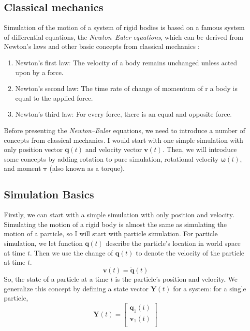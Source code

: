 \subsection{Classical mechanics}
Simulation of the motion of a system of rigid bodies is based on a famous system of differential equations, the \textit{Newton–Euler equations}, which can be derived from Newton’s laws and other basic concepts from classical mechanics \cite{bender2014interactive}:

\begin{enumerate}
    \item Newton’s first law: The velocity of a body remains unchanged unless acted upon by a force.
    \item Newton’s second law: The time rate of change of momentum of r a body is equal to the applied force.
    \item Newton’s third law: For every force, there is an equal and opposite force.
\end{enumerate}

Before presenting the \textit{Newton–Euler} equations, we need to introduce a number of concepts from classical mechanics. I would start with one simple simulation with only position vector $\pmb{q}(t)$ and velocity vector $\pmb{v}(t)$. Then, we will introduce some concepts by adding rotation to pure simulation, rotational velocity $\pmb{\omega}(t)$, and moment $\pmb{\tau}$ (also known as a torque).


\subsection{Simulation Basics}

Firstly, we can start with a simple simulation with only position and velocity. Simulating the motion of a rigid body is almost the same as simulating the motion of a particle, so I will start with particle simulation. For particle simulation, we let function $\pmb{q}(t)$ describe the particle's location in world space at time $t$. Then we use the change of $\pmb{q}(t)$
to denote the velocity of the particle at time $t$. 
\begin{equation}
    \pmb{v}(t) = \dot{\pmb{q}}(t)
\end{equation}
So, the state of a particle at a time $t$ is the particle's position and velocity. We generalize this concept by defining a state vector $\textbf{Y}(t)$ for a system: for a single particle,
\begin{equation}
    \textbf{Y}(t) = \left[
        \begin{array}{c}
            \pmb{q}_{1}(t) \\
            \pmb{v}_{1}(t) \\
        \end{array}
    \right]
\end{equation}


